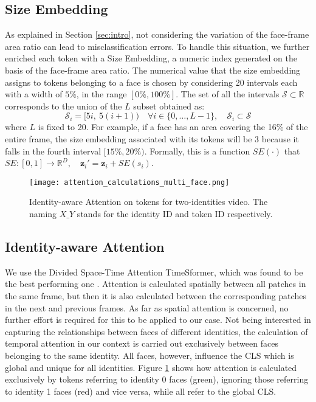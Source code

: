 \documentclass[10pt,twocolumn,letterpaper]{article}
\begin{document}
\subsection{Size Embedding}
As explained in Section \ref{sec:intro}, not considering the variation of the face-frame area ratio can lead to misclassification errors. To handle this situation, we further enriched each token with a Size Embedding, a numeric index generated on the basis of the face-frame area ratio. The numerical value that the size embedding assigns to tokens belonging to a face is chosen by considering 20 intervals each with a width of $5\%$, in the range $[0\%, 100\%]$.
The set of all the intervals $\mathcal{S} \subset \mathbb{R}$ corresponds to the union of the $L$ subset obtained as:
$$ \mathcal{S}_i = [5i,\ 5(i+1)) \quad \forall i \in \{0,\ldots, L-1\}, \quad \mathcal{S}_i \subset \mathcal{S}$$
where $L$ is fixed to 20. 
For example, if a face has an area covering the 16\% of the entire frame, the size embedding associated with its tokens will be $3$ because it falls in the fourth interval $[15\%, 20\%)$. 
Formally, this is a function $SE(\cdot)$ that $SE:[0, 1]\rightarrow\mathbb{R}^D, \quad \textbf{z}_i'=\textbf{z}_i+SE(s_i)$.
\begin{figure}[t]
    \centering
    \texttt{[image: attention\_calculations\_multi\_face.png]}
    \caption{Identity-aware Attention on tokens for two-identities video. The naming $X\_Y$ stands for the identity ID and token ID respectively.}
    \label{fig:attention}
\end{figure}

\subsection{Identity-aware Attention}
We use the Divided Space-Time Attention TimeSformer, which was found to be the best performing one \cite{Bertasius2021IsSA}. Attention is calculated spatially between all patches in the same frame, but then it is also calculated between the corresponding patches in the next and previous frames. As far as spatial attention is concerned, no further effort is required for this to be applied to our case. Not being interested in capturing the relationships between faces of different identities, the calculation of temporal attention in our context is carried out exclusively between faces belonging to the same identity.
All faces, however, influence the CLS which is global and unique for all identities. 
Figure \ref{fig:attention} shows how attention is calculated exclusively by tokens referring to identity 0 faces (green), ignoring those referring to identity 1 faces (red) and vice versa, while all refer to the global CLS.
\end{document}
